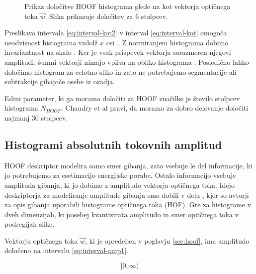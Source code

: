 \begin{figure}[htb]
\centering
\resizebox{0.5\columnwidth}{!}{}
\caption[Prikaz določitve HOOF histograma glede na kot vektorja]{Prikaz določitve HOOF histograma glede na kot vektorja optičnega toka $\vec{w}$. Slika prikazuje določitev za $6$ stolpcev.}
\label{fig:hoof-histogram}
\end{figure}




Preslikava intervala \eqref{eq:interval-kot2} v interval \eqref{eq:interval-kot} omogoča neodvisnost histograma vzdolž $x$ osi~\cite{chaudhry2009histograms}. Z normiranjem histograma dobimo invariantnost na skalo \cite{chaudhry2009histograms}. Ker je vsak prispevek vektorja sorazmeren njegovi amplitudi, šumni vektorji nimajo vpliva na obliko histograma \cite{chaudhry2009histograms}. Posledično lahko določimo histogram za celotno sliko in zato ne potrebujemo segmentacije ali subtrakcije gibajoče osebe iz ozadja. 

Edini parameter, ki ga moramo določiti za HOOF značilke je število stolpcev histograma $N_{HOOF}$. Chaudry et al \cite{chaudhry2009histograms} pravi, da moramo za dobro delovanje določiti najmanj $30$ stolpcev. 







\subsection{Histogrami absolutnih tokovnih amplitud}\label{sec:hafa}
HOOF deskriptor modelira samo smer gibanja, zato vsebuje le del informacije, ki jo potrebujemo za esetimacijo energijske porabe. Ostalo informacijo vsebuje amplituda gibanja, ki jo dobimo z amplitudo vektorja optičnega toka. Idejo deskriptorja za modeliranje amplitude gibanja smo dobili v delu \cite{pers2010histograms}, kjer so avtorji za opis gibanja uporabili histograme optičnega toka (HOF). Gre za histograme v dveh dimenzijah, ki posebej kvantizirata amplitudo in smer optičnega toka v podregijah slike. 

Vektorju optičnega toka $\vec{w}$, ki je opredeljen v poglavju \ref{sec:hoof}, ima amplitudo določeno na intervalu \eqref{eq:interval-amp1}. 

\begin{equation}\label{eq:interval-amp1}
	[0, \infty)
\end{equation}


